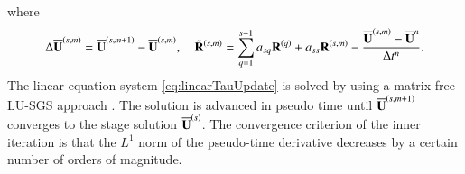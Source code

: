 {where
\begin{equation}
    \label{eq:define-inc}
    \mathrm\Delta \overline{\mathbf{U}}^{\left(s,m\right)}= 
    \overline{\mathbf{U}}^{\left(s,m+1\right)} - \overline{\mathbf{U}}^{\left(s,m\right)}, \quad 
    \tilde{\mathbf{R}}^{\left(s,m\right)}= 
    \sum_{q=1}^{s-1} a_{sq} \mathbf{R}^{\left(q\right)} + 
    a_{ss} \mathbf{R}^{\left(s,m\right)} - 
    \dfrac{\overline{\mathbf{U}}^{\left(s,m\right)} - \overline{\mathbf{U}}^{n}}{\mathrm\Delta t^n}.
\end{equation}
The linear equation system \eqref{eq:linearTauUpdate} is solved by using a matrix-free LU-SGS approach \cite{luo1998fast}. The solution is advanced in pseudo time until $\overline{\mathbf{U}}^{\left(s,m+1\right)}$ converges to the stage solution $\overline{\mathbf{U}}^{\left(s\right)}$. The convergence criterion of the inner iteration is that the $L^1$ norm of the pseudo-time derivative decreases by a certain number of orders of magnitude.
}
